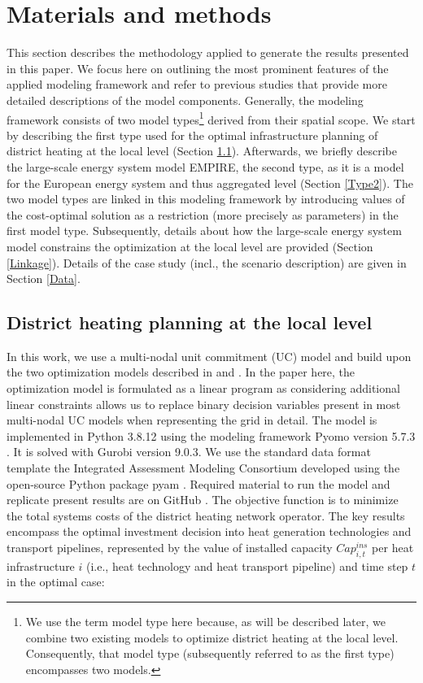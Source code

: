 \section{Materials and methods}\label{methodology}
This section describes the methodology applied to generate the results presented in this paper. We focus here on outlining the most prominent features of the applied modeling framework and refer to previous studies that provide more detailed descriptions of the model components. Generally, the modeling framework consists of two model types\footnote{We use the term model type here because, as will be described later, we combine two existing models to optimize district heating at the local level. Consequently, that model type (subsequently referred to as the first type) encompasses two models.} derived from their spatial scope. We start by describing the first type used for the optimal infrastructure planning of district heating at the local level (Section \ref{Type1}). Afterwards, we briefly describe the large-scale energy system model EMPIRE, the second type, as it is a model for the European energy system and thus aggregated level (Section \ref{Type2}). The two model types are linked in this modeling framework by introducing values of the cost-optimal solution as a restriction (more precisely as parameters) in the first model type. Subsequently, details about how the large-scale energy system model constrains the optimization at the local level are provided (Section \ref{Linkage}). Details of the case study (incl., the scenario description) are given in Section \ref{Data}. 

\subsection{District heating planning at the local level}\label{Type1}
In this work, we use a multi-nodal unit commitment (UC) model and build upon the two optimization models described in \cite{zwickl2022demystifying} and \cite{zwickl2022decommissioning}. In the paper here, the optimization model is formulated as a linear program as considering additional linear constraints allows us to replace binary decision variables present in most multi-nodal UC models when representing the grid in detail. The model is implemented in Python 3.8.12 using the modeling framework Pyomo version 5.7.3 \cite{hart2017optimization}. It is solved with Gurobi version 9.0.3. We use the standard data format template the Integrated Assessment Modeling Consortium developed using the open-source Python package pyam \cite{huppmann2021pyam}. Required material to run the model and replicate present results are on GitHub \cite{zwickl}. The objective function is to minimize the total systems costs of the district heating network operator. The key results encompass the optimal investment decision into heat generation technologies and transport pipelines, represented by the value of installed capacity $Cap^{ins}_{i, t}$ per heat infrastructure $i$ (i.e., heat technology and heat transport pipeline) and time step $t$ in the optimal case:

